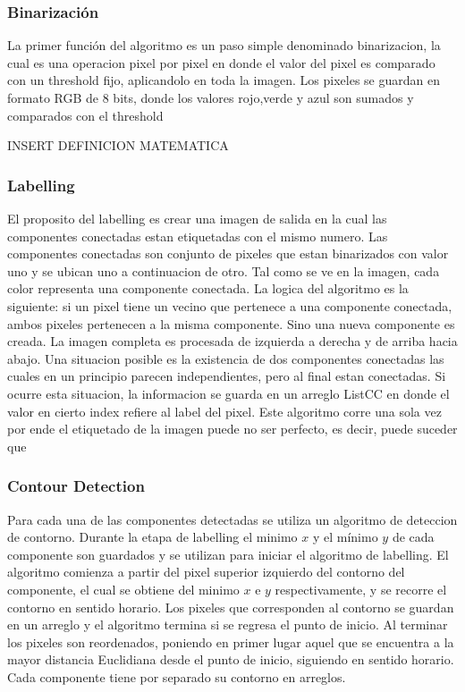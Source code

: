 \documentclass[runningheads]{llncs}
\begin{document}
\subsubsection{Binarización}

La primer función del algoritmo es un paso simple denominado binarizacion, la cual es una 
operacion pixel por pixel en donde el valor del pixel es comparado con un threshold fijo, 
aplicandolo en toda la imagen. Los pixeles se guardan en formato RGB de 8 bits, donde los 
valores rojo,verde y azul son sumados y comparados con el threshold

INSERT DEFINICION MATEMATICA

\subsubsection{Labelling}

El proposito del labelling es crear una imagen de salida en la cual las componentes conectadas 
estan etiquetadas con el mismo numero. Las componentes conectadas son conjunto de pixeles que 
estan binarizados con valor uno y se ubican uno a continuacion de otro. Tal como se ve en la imagen, 
cada color representa una componente conectada.
La logica del algoritmo es la siguiente: si un pixel tiene un vecino que pertenece a una componente 
conectada, ambos pixeles pertenecen a la misma componente. Sino una nueva componente es creada. La 
imagen completa es procesada de izquierda a derecha y de arriba hacia abajo. Una situacion posible 
es la existencia de dos componentes conectadas las cuales en un principio parecen independientes, 
pero al final estan conectadas. Si ocurre esta situacion, la informacion se guarda en un arreglo ListCC 
en donde el valor en cierto index refiere al label del pixel. Este algoritmo corre una sola vez por ende 
el etiquetado de la imagen puede no ser perfecto, es decir, puede suceder que  

\subsubsection{Contour Detection}

Para cada una de las componentes detectadas se utiliza un algoritmo de deteccion de contorno. Durante la 
etapa de labelling el minimo $x$ y el mínimo $y$ de cada componente son guardados y se utilizan para iniciar 
el algoritmo de labelling. El algoritmo comienza a partir del pixel superior izquierdo del contorno del componente, el cual se obtiene del minimo $x$ e $y$ respectivamente, y se recorre el contorno en sentido horario. Los pixeles que corresponden al contorno se guardan en un arreglo 
y el algoritmo termina si se regresa el punto de inicio. Al terminar los pixeles son reordenados, poniendo en primer 
lugar aquel que se encuentra a la mayor distancia Euclidiana desde el punto de inicio, siguiendo en sentido 
horario. Cada componente tiene por separado su contorno en arreglos. \cite{report}
\end{document}
